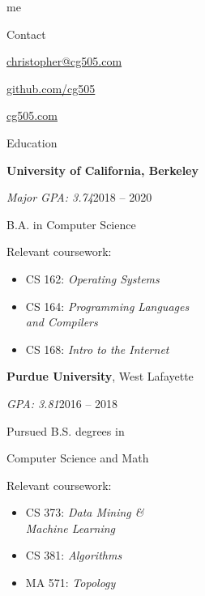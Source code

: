 \begin{minipage}[t]{0.305\textwidth}
  {\Huge me \phantom{my work}}

  \vspace{10pt}

  {\sectionfont Contact}
  \vspace{5pt}
  \begin{adjustwidth}{10pt}{}
    \href{mailto:christopher@cg505.com}{christopher@cg505.com}

    \href{https://github.com/cg505/}{github.com/cg505}


    \href{https://cg505.com/}{cg505.com}
  \end{adjustwidth}

  \vspace{10pt}

  {\sectionfont Education}

  \vspace{5pt}
  \textbf{University of California, Berkeley}%
  \vspace{2pt}
  \begin{adjustwidth}{10pt}{}
   \emph{Major GPA: 3.74}\hfill{}2018 -- 2020

    B.A. in Computer Science

    Relevant coursework:
    \begin{itemize}[leftmargin=*]
    \item CS 162: \emph{Operating Systems}
    \item CS 164: \emph{Programming Languages}\\\phantom{CS 164: }\emph{and Compilers}
    \item CS 168: \emph{Intro to the Internet}
    \end{itemize}
  \end{adjustwidth}

  \vspace{5pt}
  \textbf{Purdue University}, West Lafayette
  \vspace{2pt}
  \begin{adjustwidth}{10pt}{}
    \emph{GPA: 3.81}\hfill{}2016 -- 2018

    Pursued B.S. degrees in

    \enskip Computer Science and Math


    Relevant coursework:
    \begin{itemize}[leftmargin=*]
    \item CS 373: \emph{Data Mining \&}\\\phantom{CS 373: }\emph{Machine Learning}
    \item CS 381: \emph{Algorithms}
    \item MA 571: \emph{Topology}
    \end{itemize}
  \end{adjustwidth}


\end{minipage}
